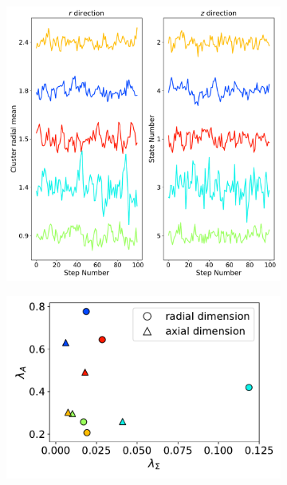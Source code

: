 \documentclass[journal=jpcbfk,manuscript=article]{achemso}
\begin{document}
  \begin{figure}
  \centering
  \begin{subfigure}{0.58\textwidth}
  \includegraphics[width=\textwidth]{common_states.pdf}
  \caption{}\label{fig:common_states_lines}
  \end{subfigure}
  \begin{subfigure}{0.41\textwidth}
  \includegraphics[width=\textwidth]{A_sigma_scatter.pdf}
  \caption{}\label{fig:A_sigma_scatter}

\end{subfigure}
\end{figure}
\end{document}
